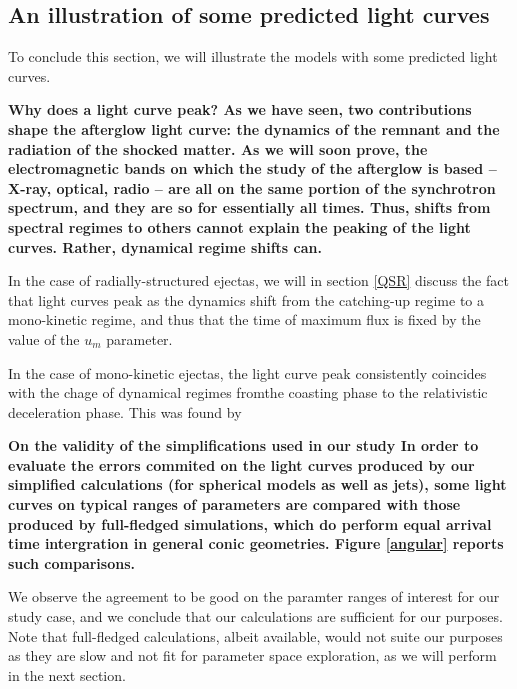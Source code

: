 \subsection{An illustration of some predicted light curves}
To conclude this section, we will illustrate the models with some predicted light curves.


\bf{Why does a light curve peak? }As we have seen, two contributions shape the afterglow light curve: the dynamics of the remnant and the radiation of the shocked matter. As we will soon prove, the electromagnetic bands on which the study of the afterglow is based -- X-ray, optical, radio -- are all on the same portion of the synchrotron spectrum, and they are so for essentially all times. Thus, shifts from spectral regimes to others cannot explain the peaking of the light curves. Rather, dynamical regime shifts can.

In the case of radially-structured ejectas, we will in section \ref{QSR} discuss the fact that light curves peak as the dynamics shift from the catching-up regime to a mono-kinetic regime, and thus that the time of maximum flux is fixed by the value of the $u_m$ parameter.

In the case of mono-kinetic ejectas, the light curve peak consistently coincides with the chage of dynamical regimes fromthe coasting phase to the relativistic deceleration phase. This was found by 

\bf{On the validity of the simplifications used in our study}
In order to evaluate the errors commited on the light curves produced by our simplified calculations (for spherical models as well as jets), some light curves on typical ranges of parameters are compared with those produced by full-fledged simulations, which do perform equal arrival time intergration in general conic geometries. Figure \ref{angular} reports such comparisons.


We observe the agreement to be good on the paramter ranges of interest for our study case, and we conclude that our calculations are sufficient for our purposes. Note that full-fledged calculations, albeit available, would not suite our purposes as they are slow and not fit for parameter space exploration, as we will perform in the next section.

